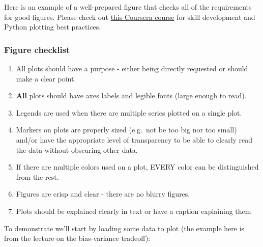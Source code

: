 \documentclass[
  letterpaper,
  DIV=11,
  numbers=noendperiod]{scrartcl}
\providecommand{\tightlist}{%
  \setlength{\itemsep}{0pt}\setlength{\parskip}{0pt}}\usepackage{longtable,booktabs,array}
\begin{document}
Here is an example of a well-prepared figure that checks all of the
requirements for good figures. Please check out
\href{https://www.coursera.org/learn/python-data-modeling}{this Coursera
course} for skill development and Python plotting best practices.

\subsubsection{Figure checklist}\label{figure-checklist}

\begin{enumerate}
\def\labelenumi{\arabic{enumi}.}
\tightlist
\item
  All plots should have a purpose - either being directly requested or
  should make a clear point.
\item
  \textbf{All} plots should have axes labels and legible fonts (large
  enough to read).
\item
  Legends are used when there are multiple series plotted on a single
  plot.
\item
  Markers on plots are properly sized (e.g.~not be too big nor too
  small) and/or have the appropriate level of transparency to be able to
  clearly read the data without obscuring other data.
\item
  If there are multiple colors used on a plot, EVERY color can be
  distinguished from the rest.
\item
  Figures are crisp and clear - there are no blurry figures.
\item
  Plots should be explained clearly in text or have a caption explaining
  them
\end{enumerate}

To demonstrate we'll start by loading some data to plot (the example
here is from the lecture on the bias-variance tradeoff):
\end{document}
